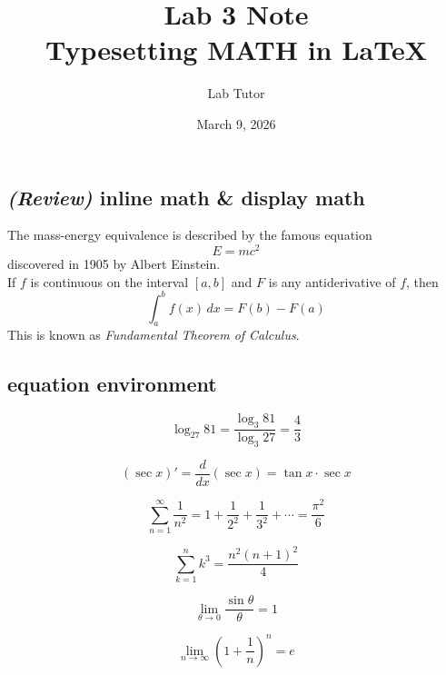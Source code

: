 \documentclass{article}
\title{Lab 3 Note\\ {\small Typesetting MATH in \LaTeX}}
\author{Lab Tutor }
\date{March 9, 2026}
\begin{document}
	
\maketitle

\tableofcontents
\subsection{\textit{(Review)} inline math \& display math}
The mass-energy equivalence is described by the famous equation
\[ E=mc^2 \]
discovered in 1905 by Albert Einstein. \\

\noindent If $f$ is continuous on the interval $[a,b]$ and $F$ is any antiderivative of $f$, then
\[
\int _{a}^{b} f(x)\,dx =F(b)-F(a)
\]
This is known as \textit{Fundamental Theorem of Calculus}.


\subsection{equation environment}

\begin{equation}
	\log_{27} 81=\frac{\log_3 81}{\log_3 27}=\frac{4}{3}
\end{equation}

\begin{equation}
	(\sec x)'=\frac{d}{dx} (\sec x )= \tan x \cdot \sec x
\end{equation}

\begin{equation}
	\sum_{n=1}^{\infty} \frac{1}{n^2}=1+\frac{1}{2^2}+\frac{1}{3^2}+\cdots =\frac{\pi^2}{6}
\end{equation}

\begin{equation*} %
	\sum_{k=1}^{n} k^3=\frac{n^2(n+1)^2}{4}
\end{equation*}

\begin{equation}
	\lim_{\theta \to 0} \frac{\sin\theta}{\theta} = 1
\end{equation}

\begin{equation}
	\lim_{n\to\infty} \left( 1+\frac{1}{n}\right) ^n =e
\end{equation}
\end{document}
